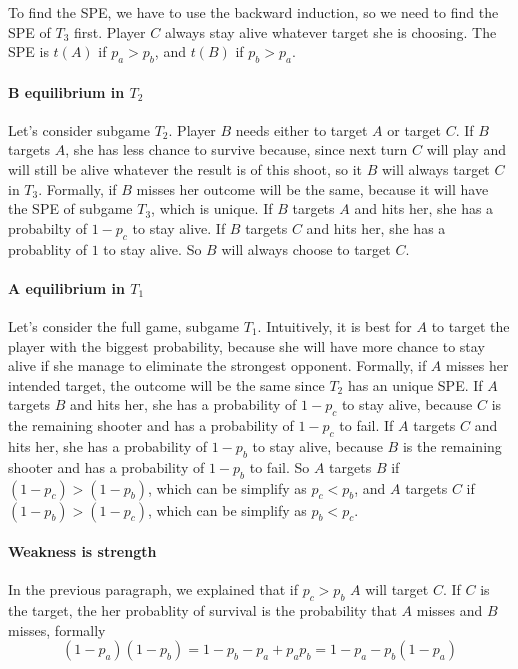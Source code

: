 \documentclass[letterpaper]{article}
\begin{document}
To find the SPE, we have to use the backward induction, so we need to find
the SPE of $T_3$ first. Player $C$ always stay alive whatever target she is
choosing. The SPE is $t(A)$ if $p_a > p_b$, and $t(B)$ if $p_b > p_a$.

\paragraph{B equilibrium in $T_2$}

Let's consider subgame $T_2$. Player $B$ needs either to target $A$
or target $C$. If $B$ targets $A$, she has less chance to survive because,
since next turn $C$ will play and will still be alive whatever the result is
of this shoot, so it $B$ will always target $C$ in $T_3$.
Formally, if $B$ misses her outcome will be the same, because it will have
the SPE of subgame $T_3$, which is unique.
If $B$ targets $A$ and hits her, she has
a probabilty of $1 - p_c$ to stay alive. If $B$ targets $C$ and hits her, she
has a probablity of $1$ to stay alive. So $B$ will always choose to target $C$.

\paragraph{A equilibrium in $T_1$}

Let's consider the full game, subgame $T_1$. Intuitively, it is best for
$A$ to target the player with the biggest probability, because she will have
more chance to stay alive if she manage to eliminate the strongest opponent.
Formally, if $A$ misses her intended target, the outcome will be the same
since $T_2$ has an unique SPE. If $A$ targets $B$ and hits her, she has
a probability of $1 - p_c$ to stay alive, because $C$ is
the remaining shooter and has a probability of $1 - p_c$ to fail.
If $A$ targets $C$ and hits her,
she has a probability of $1 - p_b$ to stay alive, because $B$ is
the remaining shooter and has a probability of $1 - p_b$ to fail.
So $A$ targets $B$ if
$ (1 - p_c) > (1 - p_b)$, which can be simplify as
$p_c < p_b$, and $A$ targets $C$
if $(1 - p_b) > (1 - p_c)$, which can be simplify as $p_b < p_c$.


\paragraph{Weakness is strength}

In the previous paragraph, we explained that if $p_c > p_b$
$A$ will target $C$. If $C$ is the target, the her probablity of survival
is the probability that $A$ misses and $B$ misses,
formally
\begin{equation}
    (1 - p_a)(1 - p_b) = 1 - p_b - p_a + p_ap_b = 1 - p_a - p_b(1 - p_a)
\end{equation}
\end{document}
